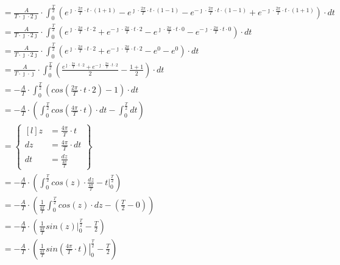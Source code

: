 \begin{task}
\begin{align*}
&=\frac{A}{T\cdot \jmath \cdot 2\jmath} \cdot \int_{0}^{\frac{T}{2}} \left(e^{\jmath \cdot \frac{2\pi}{T} \cdot t \cdot \left(1+1\right)} - e^{\jmath \cdot \frac{2\pi}{T} \cdot t \cdot \left(1 - 1\right)} - e^{-\jmath \cdot \frac{2\pi}{T} \cdot t \cdot \left(1 -1\right)} + e^{-\jmath \cdot \frac{2\pi}{T} \cdot t \cdot \left(1+1\right)} \right) \cdot dt\\
&=\frac{A}{T\cdot\jmath\cdot 2\jmath} \cdot \int_{0}^{\frac{T}{2}} \left(e^{\jmath \cdot \frac{2\pi}{T} \cdot t \cdot 2} + e^{-\jmath \cdot \frac{2\pi}{T} \cdot t \cdot 2} - e^{\jmath \cdot \frac{2\pi}{T} \cdot t \cdot 0} - e^{-\jmath \cdot \frac{2\pi}{T} \cdot t \cdot 0} \right) \cdot dt\\
&=\frac{A}{T\cdot\jmath\cdot 2\jmath} \cdot \int_{0}^{\frac{T}{2}} \left(e^{\jmath \cdot \frac{2\pi}{T} \cdot t \cdot 2} + e^{-\jmath \cdot \frac{2\pi}{T} \cdot t \cdot 2} - e^{0} - e^{0} \right) \cdot dt\\
&=\frac{A}{T\cdot \jmath \cdot \jmath} \cdot \int_{0}^{\frac{T}{2}} \left( \frac{e^{\jmath \cdot \frac{2\pi}{T} \cdot t \cdot 2} + e^{-\jmath \cdot \frac{2\pi}{T} \cdot t \cdot 2}}{2} - \frac{1 + 1}{2} \right) \cdot dt\\
&=-\frac{A}{T} \cdot \int_{0}^{\frac{T}{2}} \left( cos\left( \frac{2\pi}{T} \cdot t \cdot 2 \right) - 1 \right) \cdot dt\\
&=-\frac{A}{T} \cdot \left( \int_{0}^{\frac{T}{2}} cos\left( \frac{4\pi}{T} \cdot t \right) \cdot dt - \int_{0}^{\frac{T}{2}} dt \right)\\
&=\begin{Bmatrix*}[l]
z&=\frac{4\pi}{T} \cdot t\\ 
dz&=\frac{4\pi}{T} \cdot dt\\
dt&=\frac{dz}{\frac{4\pi}{T}}
\end{Bmatrix*}\\
&=-\frac{A}{T} \cdot \left( \int_{0}^{\frac{T}{2}} cos\left( z\right) \cdot \frac{dz}{\frac{4\pi}{T}} - \left. t\right|_{0}^{\frac{T}{2}} \right)\\
&=-\frac{A}{T} \cdot \left( \frac{1}{\frac{4\pi}{T}} \int_{0}^{\frac{T}{2}} cos\left( z\right) \cdot dz - \left( \frac{T}{2} - 0\right) \right)\\
&=-\frac{A}{T} \cdot \left( \frac{1}{\frac{4\pi}{T}} \left. sin\left( z\right) \right|_{0}^{\frac{T}{2}} - \frac{T}{2} \right)\\
&=-\frac{A}{T} \cdot \left( \frac{1}{\frac{4\pi}{T}} \left. sin\left( \frac{4\pi}{T} \cdot t \right) \right|_{0}^{\frac{T}{2}} - \frac{T}{2} \right)\\

\end{align*}
\end{task}
